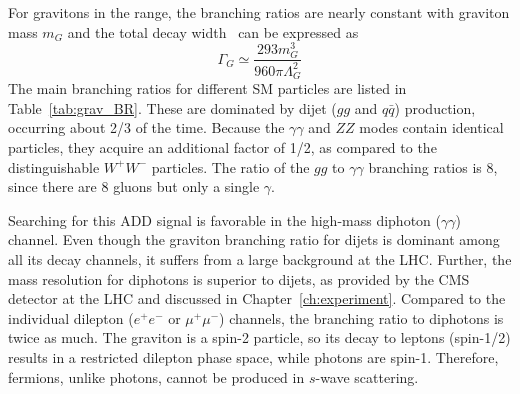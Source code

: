 For \KK gravitons in the {\TeVns} range, the branching ratios are nearly constant with graviton mass $m_G$ and the total decay width~\cite{Bijnens:2001gh,Tang:2012pv} can be expressed as
\begin{equation}
	\Gamma_{G} \simeq \frac{293m^3_{G}}{960\pi \Lambda^2_{G}}
\end{equation}
The main branching ratios for different SM particles are listed in Table~\ref{tab:grav_BR}. These are dominated by dijet ($gg$ and $q\bar{q}$) production, occurring about 2/3 of the time. Because the $\gamma\gamma$ and $ZZ$ modes contain identical particles, they acquire an additional factor of 1/2, as compared to the distinguishable $W^+W^-$ particles.  The ratio of the $gg$ to $\gamma\gamma$ branching ratios is 8, since there are 8 gluons but only a single $\gamma$.

\begin{table}[!htb]
	\centering
	\caption{The branching ratios for a massive graviton \Gkk decaying to SM particles with $q=u,d,c,s,b$ and $l=e,\mu$~\cite{Tang:2012pv}. }
	\vspace{\baselineskip}
	\label{tab:grav_BR}
\end{table}

Searching for this ADD signal is favorable in the high-mass diphoton ($\gamma\gamma$) channel. Even though the \KK graviton branching ratio for dijets is dominant among all its decay channels, it suffers from a large background at the LHC. Further, the mass resolution for diphotons is superior to dijets, as provided by the CMS detector at the LHC and discussed in Chapter~\ref{ch:experiment}. Compared to the individual dilepton ($e^+e^-$ or $\mu^+\mu^-$) channels, the branching ratio to diphotons is twice as much. The graviton is a spin-2 particle, so its decay to leptons (spin-1/2) results in a restricted dilepton phase space, while photons are spin-1. Therefore, fermions, unlike photons, cannot be produced in $s$-wave scattering.

